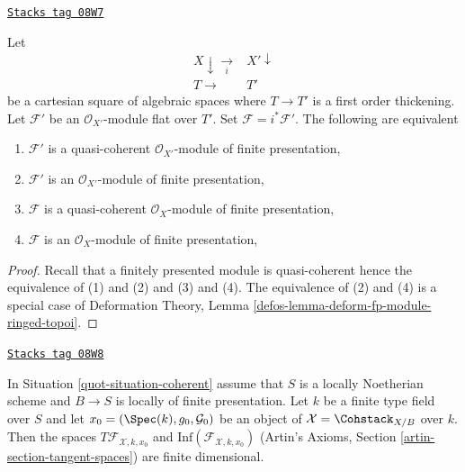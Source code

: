 \begin{lemma}
\label{quot-lemma-coherent-over-first-order-thickening}
\href{https://stacks.math.columbia.edu/tag/08W7}{\texttt{Stacks tag 08W7}}

Let
$$
\begin{array}{cc}X \downarrow\underset{i}{\longrightarrow} & X' \downarrow \\ T \longrightarrow & T'\end{array}
$$
be a cartesian square of algebraic spaces where $T \to T'$ is a first
order thickening. Let $\mathcal{F}'$ be an $\mathcal{O}_{X'}$-module
flat over $T'$. Set $\mathcal{F} = i^*\mathcal{F}'$. The following
are equivalent
\begin{enumerate}
\item $\mathcal{F}'$ is a quasi-coherent $\mathcal{O}_{X'}$-module
of finite presentation,
\item $\mathcal{F}'$ is an $\mathcal{O}_{X'}$-module of finite presentation,
\item $\mathcal{F}$ is a quasi-coherent $\mathcal{O}_X$-module
of finite presentation,
\item $\mathcal{F}$ is an $\mathcal{O}_X$-module of finite presentation,
\end{enumerate}
\end{lemma}

\begin{proof}
Recall that a finitely presented module is quasi-coherent hence the
equivalence of (1) and (2) and (3) and (4). The equivalence of (2)
and (4) is a special case of Deformation Theory, Lemma
\ref{defos-lemma-deform-fp-module-ringed-topoi}.
\end{proof}

\begin{lemma}
\label{quot-lemma-coherent-tangent-space}
\href{https://stacks.math.columbia.edu/tag/08W8}{\texttt{Stacks tag 08W8}}

In Situation \ref{quot-situation-coherent} assume that $S$ is a locally Noetherian
scheme and $B \to S$ is locally of finite presentation.
Let $k$ be a finite type field over $S$ and let
$x_0 = (\Spec(k), g_0, \mathcal{G}_0)$
be an object of $\mathcal{X} = \Cohstack_{X/B}$ over $k$. Then
the spaces $T\mathcal{F}_{\mathcal{X}, k, x_0}$ and
$\text{Inf}(\mathcal{F}_{\mathcal{X}, k, x_0})$
(Artin's Axioms, Section \ref{artin-section-tangent-spaces})
are finite dimensional.
\end{lemma}

